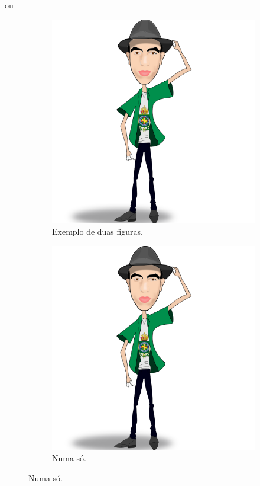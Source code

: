   \noindent ou

  \begin{figure}[H]
     \centering

     \begin{subfigure}[t]{0.4\textwidth}%
        \centering
        \includegraphics[scale=0.1]{img_ismael}
        \caption{\label{fig:placas}\footnotesize Exemplo de duas figuras.}
     \end{subfigure}
     \hspace{0.1cm}
     \begin{subfigure}[t]{0.4\textwidth}%
        \centering
        \includegraphics[scale=0.1]{img_ismael}
        \caption{\label{fig:pontos}\footnotesize Numa só.}
     \end{subfigure}


\end{figure}
